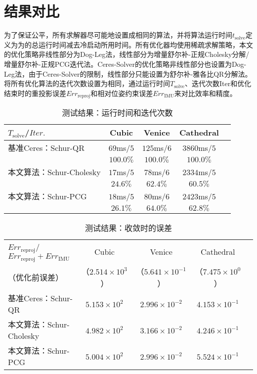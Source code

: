 \section{结果对比}

为了保证公平，所有求解器尽可能地设置成相同的算法，并将算法运行时间$t_{\text{solve}}$定义为为的总运行时间减去冷启动所用时间。所有优化器均使用稀疏求解策略，本文的优化策略非线性部分为Dog-Leg法，线性部分为增量舒尔补-正规Cholesky分解/增量舒尔补-正规PCG迭代法。Ceres-Solver的优化策略非线性部分也设置为Dog-Leg法，由于Ceres-Solver的限制，线性部分只能设置为舒尔补-雅各比QR分解法。将所有优化算法的迭代次数设置为相同，通过运行时间$T_{\text{solve}}$、迭代次数Iter和优化结束时的重投影误差$Err_{\text{reproj}}$和相对位姿约束误差$Err_{\text{IMU}}$来对比效率和精度。

{
\linespread{1}
\begin{table}[htb!]
\caption{测试结果：运行时间和迭代次数}
\label{tab:time}
\centering
\begin{tabular}[b]{l|cccc}
    \toprule
    $T_{\text{solve}}$/$Iter.$  &      Cubic &      Venice &    Cathedral \\ \midrule
    基准Ceres：Schur-QR         & $69$ms/$5$ & $125$ms/$6$ & $3860$ms/$5$ \\
                                &  $100.0\%$ &   $100.0\%$ &    $100.0\%$ \\ \midrule
    本文算法：Schur-Cholesky    & $17$ms/$5$ &  $78$ms/$6$ & $2334$ms/$5$ \\
                                &   $24.6\%$ &    $62.4\%$ &     $60.5\%$ \\ \midrule
    本文算法：Schur-PCG         & $18$ms/$5$ &  $80$ms/$6$ & $2423$ms/$5$ \\
                                &   $26.1\%$ &    $64.0\%$ &     $62.8\%$ \\
    \bottomrule
\end{tabular}
\end{table}
}

{
\linespread{1}
\begin{table}[htb!]
\caption{测试结果：收敛时的误差}
\label{tab:energy}
\centering
\begin{tabular}[b]{l|cccc}
    \toprule $Err_{\text{reproj}}$/
    $Err_{\text{reproj}}+Err_{\text{IMU}}$ &                 Cubic &                   Venice &               Cathedral \\
    （优化前误差）                         & （$2.514\times10^3$） & （$5.641\times10^{-1}$） & （$7.475\times10^{0}$） \\ \midrule
    基准Ceres：Schur-QR                    &     $5.153\times10^2$ &     $2.996\times10^{-2}$ &    $4.153\times10^{-1}$ \\
    本文算法：Schur-Cholesky               &     $4.982\times10^2$ &     $3.166\times10^{-2}$ &    $4.246\times10^{-1}$ \\
    本文算法：Schur-PCG                    &     $5.004\times10^2$ &     $2.996\times10^{-2}$ &    $5.524\times10^{-1}$ \\
    \bottomrule
\end{tabular}
\end{table}
}

